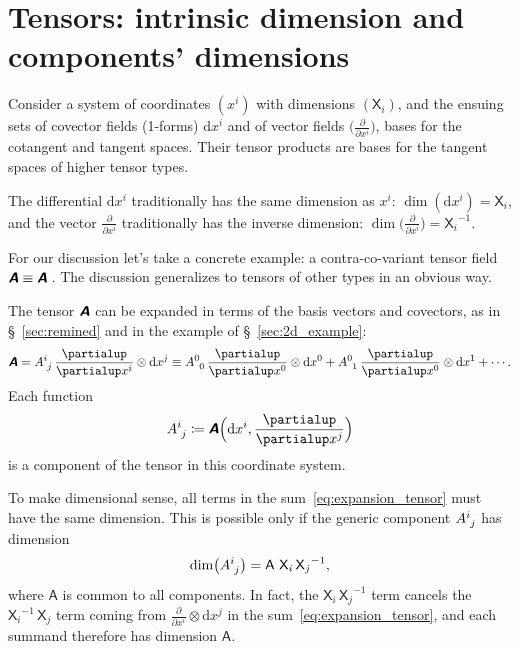 \documentclass[\ifafour a4paper,12pt,\else a5paper,10pt,\fi%
onecolumn,oneside,article,%
british%
]{memoir}
\makeatletter
\theoremstyle{remark}
\theoremstyle{innote}
\newcommand*{\mathte}[1]{\textbf{\textit{\textsf{#1}}}}
\newcommand*{\de}{\partialup}%
\newcommand*{\di}{\mathrm{d}}%
\newcommand*{\defd}{\coloneqq}
\renewcommand*{\|}[1][]{\nonscript\,#1\vert\nonscript\;\mathopen{}}
\newcommand*{\sect}{\S}%
\newcommand*{\q}{}%
\DeclareRobustCommand*{\q}{%
  \mathbin{\mathpalette\bigcdot@{}}%
}
\newcommand*{\bigcdot@scalefactor}{0.7}
\newcommand*{\bigcdot@widthfactor}{1.5}
\newcommand*{\bigcdot@}[2]{%
  \sbox0{$#1\vcenter{}$}%
  \sbox2{$#1\cdot\m@th$}%
  \hbox to \bigcdot@widthfactor\wd2{%
    \hfil
    \raise\ht0\hbox{%
      \scalebox{\bigcdot@scalefactor}{%
        \lower\ht0\hbox{$#1\bullet\m@th$}%
      }%
    }%
    \hfil
  }%
}
\newcommand*{\Xx}{\textsf{X}}
\newcommand*{\Aa}{\textsf{A}}
\newcommand*{\yA}{\mathte{A}}
\renewcommand*{\i}{\indices}
\newcommand*{\dex}[1][i]{\frac{\de}{\de x^{#1}}}
\newcommand*{\dix}[1][i]{\di x^{#1}}
\makeatother
\begin{document}
\section{Tensors: intrinsic dimension and components' dimensions}
\label{sec:tensors}

Consider a system of coordinates $(x^i)$ with dimensions $(\Xx_i)$, and the
ensuing sets of covector fields (1-forms) $\dix$ and of vector fields
$\bigl(\dex\bigr)$, bases for the cotangent and tangent spaces. Their
tensor products are bases for the tangent spaces of higher tensor types.

The differential $\dix$ traditionally has the same dimension as $x^{i}$:
$\dim(\dix) = \Xx_{i}$, and the vector $\dex$ traditionally has the
inverse dimension: $\dim\bigl(\dex\bigr) = {\Xx_{i}}^{-1}$.

For our discussion let's take a concrete example: a contra-co-variant tensor
field $\yA \equiv \yA\i{^{\q}_{\q}}$\,. The discussion generalizes to tensors
of other types in an obvious way.

The tensor $\yA$ can be expanded in terms of the basis vectors and
covectors, as in \sect~\ref{sec:remined} and in the example of
\sect~\ref{sec:2d_example}:
\begin{equation}
  \label{eq:expansion_tensor}
  \yA = A\i{^{i}_{j}}\, \dex\otimes\dix[j]
  \equiv A\i{^{0}_{0}}\,\dex[0]\otimes\dix[0] + 
  A\i{^{0}_{1}}\,\dex[0]\otimes\dix[1] + \dotsb {}.
\end{equation}
Each function
\begin{equation}
  A\i{^{i}_{j}} \defd  \yA\Bigl(\dix, \dex[j]\Bigr)
  \label{eq:components_def}
\end{equation}
is a component of the tensor in this coordinate system.

\medskip

To make dimensional sense, all terms in the sum~\eqref{eq:expansion_tensor}
must have the same dimension. This is possible only if the generic
component $A\i{^{i}_{j}}$ has dimension
\begin{equation}
  \label{eq:dim_component}
  \dim\bigl(A\i{^{i}_{j}}\bigr) = \Aa\ {\Xx_{i}}\,{\Xx_{j}}^{-1},
\end{equation}
where $\Aa$ is common to all components. In fact, the
${\Xx_{i}}\,{\Xx_{j}}^{-1}$ term cancels the ${\Xx_{i}}^{-1}\,{\Xx_{j}}$
term coming from $\dex\otimes\dix[j]$ in the
sum~\eqref{eq:expansion_tensor}, and each summand therefore has dimension
$\Aa$.
\end{document}
